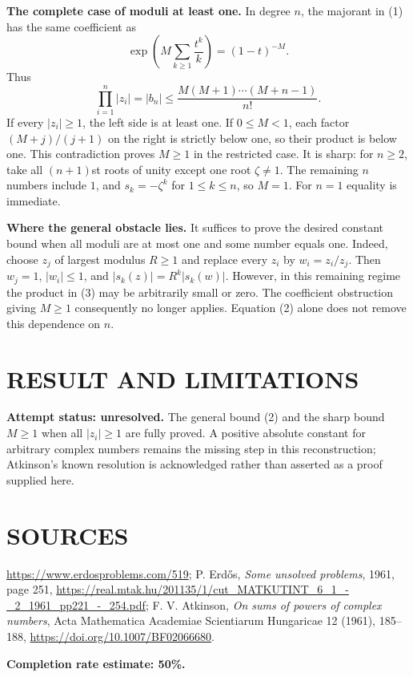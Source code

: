 \textbf{The complete case of moduli at least one.} In degree $n$, the majorant in (1) has the same coefficient as
\[
 \exp\left(M\sum_{k\geq1}\frac{t^k}{k}\right)
 =(1-t)^{-M}.
\]
Thus
\[
 \prod_{i=1}^n|z_i|=|b_n|
 \leq\frac{M(M+1)\cdots(M+n-1)}{n!}.                 \tag{3}
\]
If every $|z_i|\geq1$, the left side is at least one. If $0\leq M<1$, each factor $(M+j)/(j+1)$ on the right is strictly below one, so their product is below one. This contradiction proves $M\geq1$ in the restricted case. It is sharp: for $n\geq2$, take all $(n+1)$st roots of unity except one root $\zeta\ne1$. The remaining $n$ numbers include $1$, and $s_k=-\zeta^k$ for $1\leq k\leq n$, so $M=1$. For $n=1$ equality is immediate.

\textbf{Where the general obstacle lies.} It suffices to prove the desired constant bound when all moduli are at most one and some number equals one. Indeed, choose $z_j$ of largest modulus $R\geq1$ and replace every $z_i$ by $w_i=z_i/z_j$. Then $w_j=1$, $|w_i|\leq1$, and $|s_k(z)|=R^k|s_k(w)|$. However, in this remaining regime the product in (3) may be arbitrarily small or zero. The coefficient obstruction giving $M\geq1$ consequently no longer applies. Equation (2) alone does not remove this dependence on $n$.

\section{RESULT AND LIMITATIONS}
\textbf{Attempt status: unresolved.} The general bound (2) and the sharp bound $M\geq1$ when all $|z_i|\geq1$ are fully proved. A positive absolute constant for arbitrary complex numbers remains the missing step in this reconstruction; Atkinson's known resolution is acknowledged rather than asserted as a proof supplied here.

\section{SOURCES}
\url{https://www.erdosproblems.com/519}; P. Erd\H{o}s, \emph{Some unsolved problems}, 1961, page 251, \url{https://real.mtak.hu/201135/1/cut_MATKUTINT_6_1_-_2_1961_pp221_-_254.pdf}; F. V. Atkinson, \emph{On sums of powers of complex numbers}, Acta Mathematica Academiae Scientiarum Hungaricae 12 (1961), 185--188, \url{https://doi.org/10.1007/BF02066680}.

\textbf{Completion rate estimate: 50\%.}
